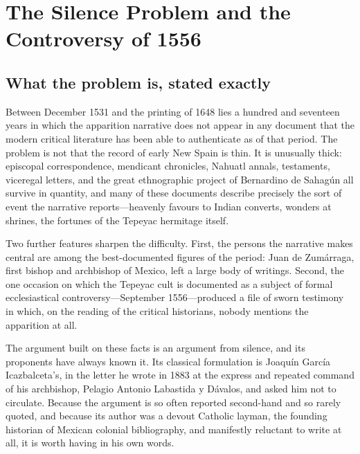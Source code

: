 \sectionguard
\section{The Silence Problem and the Controversy of 1556}

\subsection{What the problem is, stated exactly}

Between December 1531 and the printing of 1648 lies a hundred and
seventeen years in which the apparition narrative does not appear in
any document that the modern critical literature has been able to
authenticate as of that period. The problem is not that the record of
early New Spain is thin. It is unusually thick: episcopal
correspondence, mendicant chronicles, Nahuatl annals, testaments,
viceregal letters, and the great ethnographic project of Bernardino
de Sahag\'un all survive in quantity, and many of these documents
describe precisely the sort of event the narrative reports---heavenly
favours to Indian converts, wonders at shrines, the fortunes of the
Tepeyac hermitage itself.

Two further features sharpen the difficulty. First, the persons the
narrative makes central are among the best-documented figures of the
period: Juan de Zum\'arraga, first bishop and archbishop of Mexico,
left a large body of writings. Second, the one occasion on which the
Tepeyac cult is documented as a subject of formal ecclesiastical
controversy---September 1556---produced a file of sworn testimony in
which, on the reading of the critical historians, nobody mentions the
apparition at all.

The argument built on these facts is an argument from silence, and
its proponents have always known it. Its classical formulation is
Joaqu\'in Garc\'ia Icazbalceta's, in the letter he wrote in 1883 at
the express and repeated command of his archbishop, Pelagio Antonio
Labastida y D\'avalos, and asked him not to circulate. Because the
argument is so often reported second-hand and so rarely quoted, and
because its author was a devout Catholic layman, the founding
historian of Mexican colonial bibliography, and manifestly reluctant
to write at all, it is worth having in his own words.

